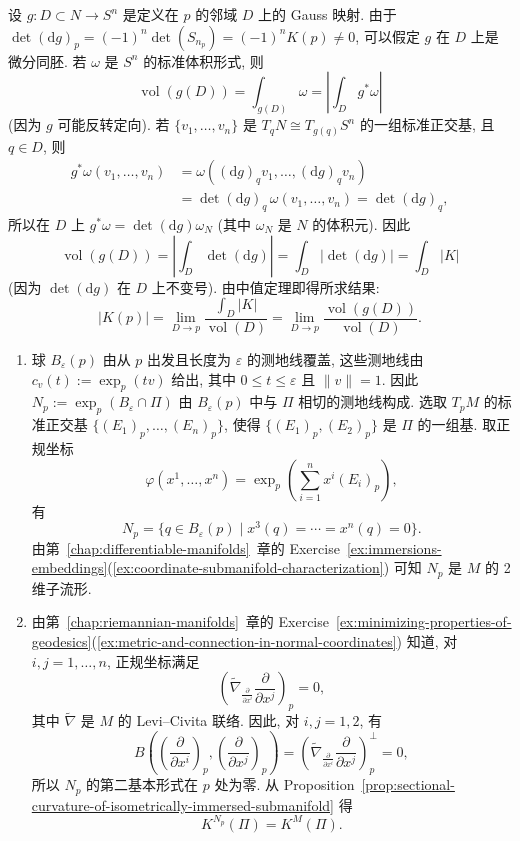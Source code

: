 \begin{description}[font=\normalfont,leftmargin=2em,labelwidth=1.5em]
设 $g:D\subset N\to S^n$ 是定义在 $p$ 的邻域 $D$ 上的 Gauss 映射. 由于 $\det(\mathrm{d}g)_p=(-1)^n\det(S_{n_p})=(-1)^nK(p)\ne0$, 可以假定 $g$ 在 $D$ 上是微分同胚. 若 $\omega$ 是 $S^n$ 的标准体积形式, 则
\[
  \operatorname{vol}(g(D))=\int_{g(D)}\omega=\left|\int_D g^*\omega\right|
\]
(因为 $g$ 可能反转定向). 若 $\{v_1,\ldots,v_n\}$ 是 $T_qN\cong T_{g(q)}S^n$ 的一组标准正交基, 且 $q\in D$, 则
\begin{align*}
  g^*\omega(v_1,\ldots,v_n)
  &=\omega((\mathrm{d}g)_qv_1,\ldots,(\mathrm{d}g)_qv_n)\\
  &=\det(\mathrm{d}g)_q\,\omega(v_1,\ldots,v_n)=\det(\mathrm{d}g)_q,
\end{align*}
所以在 $D$ 上 $g^*\omega=\det(\mathrm{d}g)\omega_N$ (其中 $\omega_N$ 是 $N$ 的体积元). 因此
\[
  \operatorname{vol}(g(D))=\left|\int_D\det(\mathrm{d}g)\right|
    =\int_D|\det(\mathrm{d}g)|=\int_D|K|
\]
(因为 $\det(\mathrm{d}g)$ 在 $D$ 上不变号). 由中值定理即得所求结果:
\[
  |K(p)|=\lim_{D\to p}\frac{\int_D|K|}{\operatorname{vol}(D)}
         =\lim_{D\to p}\frac{\operatorname{vol}(g(D))}{\operatorname{vol}(D)}.
\]

\begin{enumerate}[label=(\alph*),ref=\alph*,leftmargin=*]
\item 球 $B_\varepsilon(p)$ 由从 $p$ 出发且长度为 $\varepsilon$ 的测地线覆盖, 这些测地线由 $c_v(t):=\exp_p(tv)$ 给出, 其中 $0\le t\le\varepsilon$ 且 $\lVert v\rVert=1$. 因此 $N_p:=\exp_p(B_\varepsilon\cap\Pi)$ 由 $B_\varepsilon(p)$ 中与 $\Pi$ 相切的测地线构成. 选取 $T_pM$ 的标准正交基 $\{(E_1)_p,\ldots,(E_n)_p\}$, 使得 $\{(E_1)_p,(E_2)_p\}$ 是 $\Pi$ 的一组基. 取正规坐标
\[
  \varphi(x^1,\ldots,x^n)=\exp_p\left(\sum_{i=1}^n x^i(E_i)_p\right),
\]
有
\[
  N_p=\{q\in B_\varepsilon(p)\mid x^3(q)=\cdots=x^n(q)=0\}.
\]
由第~\ref{chap:differentiable-manifolds}~章的 Exercise~\ref{ex:immersions-embeddings}(\ref{ex:coordinate-submanifold-characterization}) 可知 $N_p$ 是 $M$ 的 2 维子流形.
\item 由第~\ref{chap:riemannian-manifolds}~章的 Exercise~\ref{ex:minimizing-properties-of-geodesics}(\ref{ex:metric-and-connection-in-normal-coordinates}) 知道, 对 $i,j=1,\ldots,n$, 正规坐标满足
\[
  \left(\widetilde\nabla_{\frac{\partial}{\partial x^i}}\frac{\partial}{\partial x^j}\right)_p=0,
\]
其中 $\widetilde\nabla$ 是 $M$ 的 Levi–Civita 联络. 因此, 对 $i,j=1,2$, 有
\[
  B\left(\left(\frac{\partial}{\partial x^i}\right)_p,
          \left(\frac{\partial}{\partial x^j}\right)_p\right)
     =\left(\widetilde\nabla_{\frac{\partial}{\partial x^i}}
             \frac{\partial}{\partial x^j}\right)_p^\perp=0,
\]
所以 $N_p$ 的第二基本形式在 $p$ 处为零. 从 Proposition~\ref{prop:sectional-curvature-of-isometrically-immersed-submanifold} 得
\[
  K^{N_p}(\Pi)=K^M(\Pi).
\]
\end{enumerate}


\end{description}
